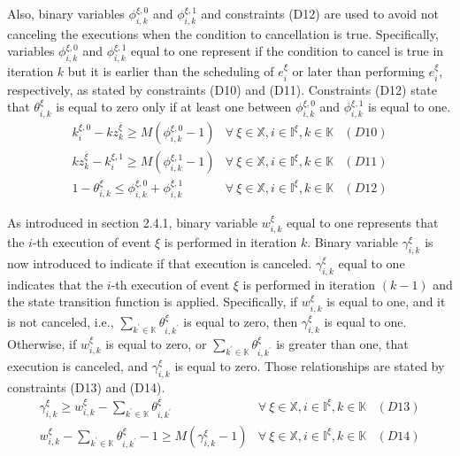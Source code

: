 \documentclass[suppldata]{interact}
\theoremstyle{plain}
\theoremstyle{definition}
\theoremstyle{remark}
\begin{document}
Also, binary variables $\phi^{\xi,0}_{i,k}$ and $\phi^{\xi,1}_{i,k}$ and constraints (D12) are used to avoid not canceling the executions when the condition to cancellation is true. Specifically, variables $\phi^{\xi,0}_{i,k}$ and $\phi^{\xi,1}_{i,k}$ equal to one represent if the condition to cancel is true in iteration $k$ but it is earlier than the scheduling of $e^{\xi}_{i}$ or later than performing $e^{\xi}_{i}$, respectively, as stated by constraints (D10) and (D11). Constraints (D12) state that $\theta^{\xi}_{i,k}$ is equal to zero only if at least one between $\phi^{\xi,0}_{i,k}$ and $\phi^{\xi,1}_{i,k}$ is equal to one. 
\begin{eqnarray}
	k^{\xi,0}_i - kz^{\bar{\xi}}_k \ge M(\phi^{\xi,0}_{i,k}-1)&\forall\ \xi\in \mathbb{X},i\in \mathbb{I}^{\xi},k\in \mathbb{K}&(D10)\nonumber\\
	kz^{\bar{\xi}}_k - k^{\xi,1}_i \ge M(\phi^{\xi,1}_{i,k}-1)&\forall\ \xi\in \mathbb{X},i\in \mathbb{I}^{\xi},k\in \mathbb{K}&(D11)\nonumber\\
	1-\theta^{\xi}_{i,k} \le \phi^{\xi,0}_{i,k} + \phi^{\xi,1}_{i,k}&\forall\ \xi\in \mathbb{X},i\in \mathbb{I}^{\xi},k\in \mathbb{K}&(D12)\nonumber
\end{eqnarray}

As introduced in section 2.4.1, binary variable $w^{\xi}_{i,k}$ equal to one represents that the $i$-th execution of event ${\xi}$ is performed in iteration $k$. Binary variable $\gamma^{\xi}_{i,k}$ is now introduced to indicate if that execution is canceled. $\gamma^{\xi}_{i,k}$ equal to one indicates that the $i$-th execution of event $\xi$ is performed in iteration $(k-1)$ and the state transition function is applied. Specifically, if $w^{\xi}_{i,k}$ is equal to one, and it is not canceled, i.e., $\sum_{k^{'}\in \mathbb{K}}\theta^{\xi}_{i,k^{'}}$ is equal to zero, then $\gamma^{\xi}_{i,k}$ is equal to one. Otherwise, if $w^{\xi}_{i,k}$ is equal to zero, or $\sum_{k^{'}\in \mathbb{K}}\theta^{\xi}_{i,k^{'}}$ is greater than one, that execution is canceled, and $\gamma^{\xi}_{i,k}$ is equal to zero. Those relationships are stated by constraints (D13) and (D14). 
\begin{eqnarray}
	\gamma^{\xi}_{i,k} \ge w^{\xi}_{i,k} - \sum_{k^{'}\in \mathbb{K}}\theta^{\xi}_{i,k^{'}}&\forall\ \xi\in \mathbb{X},i\in \mathbb{I}^{\xi},k\in \mathbb{K}&(D13)\nonumber\\
	w^{\xi}_{i,k} - \sum_{k^{'}\in \mathbb{K}}\theta^{\xi}_{i,k^{'}} -1 \ge M(\gamma^{\xi}_{i,k}-1) &\forall\ \xi\in \mathbb{X},i\in \mathbb{I}^{\xi},k\in \mathbb{K}&(D14)\nonumber
\end{eqnarray}
\end{document}
